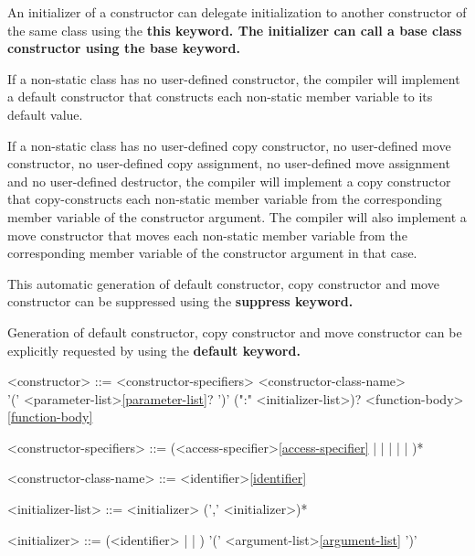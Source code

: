\documentclass[a4paper,oneside,11pt]{article}
\begin{document}
An initializer of a constructor can delegate initialization to another constructor of
the same class using the \bf{this} keyword.
The initializer can call a base class constructor using the \bf{base} keyword.

If a non-static class has no user-defined constructor, the compiler will implement a default constructor that constructs
each non-static member variable to its default value.

If a non-static class has no user-defined copy constructor,
no user-defined move constructor, no user-defined copy assignment, no user-defined move assignment and no user-defined destructor,
the compiler will implement a copy constructor that
copy-constructs each non-static member variable from the corresponding member variable of the constructor argument.
The compiler will also implement a move constructor that moves each non-static member variable from the corresponding
member variable of the constructor argument in that case.

This automatic generation of default constructor, copy constructor and move constructor can be suppressed using the \bf{suppress} keyword.

Generation of default constructor, copy constructor and move constructor can be explicitly requested by using the \bf{default} keyword.

\begin{grammar}
\label{constructor}<constructor> ::= <constructor-specifiers> <constructor-class-name>\\
'(' <parameter-list>\ref{parameter-list}? ')' (":" <initializer-list>)? <function-body>\ref{function-body}

<constructor-specifiers> ::= (<access-specifier>\ref{access-specifier} |  |  |  |  | )*

<constructor-class-name> ::= <identifier>\ref{identifier}

<initializer-list> ::= <initializer> (',' <initializer>)*

<initializer>  ::= (<identifier> |  | ) '(' <argument-list>\ref{argument-list} ')'
\end{grammar}
\end{document}
